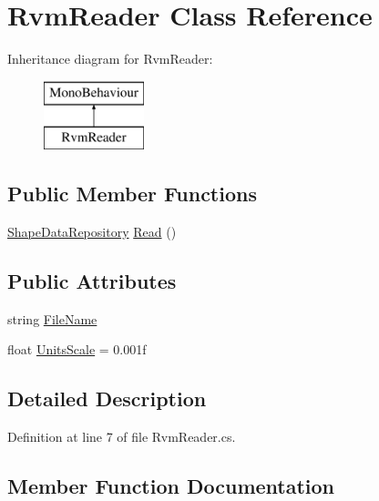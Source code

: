 \hypertarget{class_rvm_reader}{}\section{Rvm\+Reader Class Reference}
\label{class_rvm_reader}
Inheritance diagram for Rvm\+Reader\+:\begin{figure}[H]
\begin{center}
\leavevmode
\includegraphics[height=2.000000cm]{class_rvm_reader}
\end{center}
\end{figure}
\subsection*{Public Member Functions}
\begin{DoxyCompactItemize}
\item 
\mbox{\hyperlink{class_shape_data_repository}{Shape\+Data\+Repository}} \mbox{\hyperlink{class_rvm_reader_a453dc959a12db6d00466d5a730794d80}{Read}} ()
\end{DoxyCompactItemize}
\subsection*{Public Attributes}
\begin{DoxyCompactItemize}
\item 
string \mbox{\hyperlink{class_rvm_reader_aa3bd98b005bfb52c4a901a17dcd19ff1}{File\+Name}}
\item 
float \mbox{\hyperlink{class_rvm_reader_a28634b9aaf8267d15af60dd3c5b2fbd9}{Units\+Scale}} = 0.\+001f
\end{DoxyCompactItemize}


\subsection{Detailed Description}


Definition at line 7 of file Rvm\+Reader.\+cs.



\subsection{Member Function Documentation}
\mbox{\label{class_rvm_reader_a453dc959a12db6d00466d5a730794d80}} 
